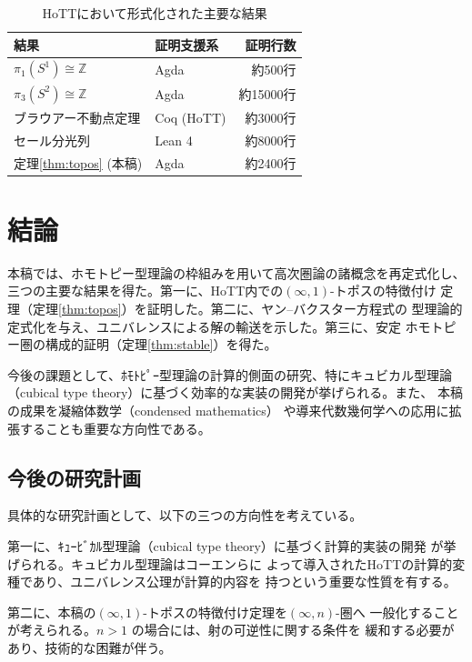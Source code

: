\documentclass[12pt,a4paper]{article}
\theoremstyle{definition}
\begin{document}
\begin{table}[H]
\centering
\caption{HoTTにおいて形式化された主要な結果}\label{tab:formalized}
\begin{tabular}{@{}llr@{}}
\toprule
結果 & 証明支援系 & 証明行数 \\
\midrule
$\pi_1(S^1) \cong \mathbb{Z}$ & Agda & 約500行 \\
$\pi_3(S^2) \cong \mathbb{Z}$ & Agda & 約15000行 \\
ブラウアー不動点定理 & Coq (HoTT) & 約3000行 \\
セール分光列 & Lean 4 & 約8000行 \\
定理\ref{thm:topos} (本稿) & Agda & 約2400行 \\
\bottomrule
\end{tabular}
\end{table}


\section{結論}

本稿では、ホモトピー型理論の枠組みを用いて高次圏論の諸概念を再定式化し、
三つの主要な結果を得た。第一に、HoTT内での$(\infty,1)$-トポスの特徴付け
定理（定理\ref{thm:topos}）を証明した。第二に、ヤン--バクスター方程式の
型理論的定式化を与え、ユニバレンスによる解の輸送を示した。第三に、安定
ホモトピー圏の構成的証明（定理\ref{thm:stable}）を得た。

今後の課題として、ﾎﾓﾄﾋﾟｰ型理論の計算的側面の研究、特にキュビカル型理論
（cubical type theory）に基づく効率的な実装の開発が挙げられる。また、
本稿の成果を凝縮体数学（condensed mathematics）\cite{scholze2019condensed}
や導来代数幾何学への応用に拡張することも重要な方向性である。

\subsection{今後の研究計画}

具体的な研究計画として、以下の三つの方向性を考えている。

第一に、ｷｭｰﾋﾞｶﾙ型理論（cubical type theory）に基づく計算的実装の開発
が挙げられる。キュビカル型理論はコーエンら\cite{cohen2018cubical}に
よって導入されたHoTTの計算的変種であり、ユニバレンス公理が計算的内容を
持つという重要な性質を有する。

第二に、本稿の$(\infty,1)$-トポスの特徴付け定理を$(\infty,n)$-圏へ
一般化することが考えられる。$n > 1$ の場合には、射の可逆性に関する条件を
緩和する必要があり、技術的な困難が伴う。
\end{document}
